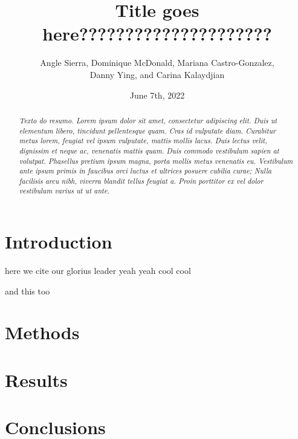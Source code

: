 \documentclass[11pt]{article}
\title {Title goes here?????????????????????\\[1ex]}
\author{
Angle Sierra, 
Dominique McDonald,
Mariana Castro-Gonzalez, \\
Danny Ying,
and Carina Kalaydjian \\[1ex]
}
\date{June 7th, 2022}
\newcommand{\abstractinenglishname}{Abstract}
\newenvironment{abstractinenglish}{
        \def\abstractname{\abstractinenglishname}
	\begin{abstract}
}{
        \end{abstract}
}
\begin{document}
\maketitle
\vspace{6pt}

\begin{abstractinenglish}
\emph{Texto do resumo. Lorem ipsum dolor sit amet, consectetur adipiscing elit. Duis ut elementum libero, tincidunt pellentesque quam. Cras id vulputate diam. Curabitur metus lorem, feugiat vel ipsum vulputate, mattis mollis lacus. Duis lectus velit, dignissim et neque ac, venenatis mattis quam. Duis commodo vestibulum sapien at volutpat. Phasellus pretium ipsum magna, porta mollis metus venenatis eu. Vestibulum ante ipsum primis in faucibus orci luctus et ultrices posuere cubilia curae; Nulla facilisis arcu nibh, viverra blandit tellus feugiat a. Proin porttitor ex vel dolor vestibulum varius ut ut ante.}
\end{abstractinenglish}

\section{Introduction}
here we cite \cite{web1} our glorius leader \cite{web2} yeah yeah cool cool \cite{briney2015data}

and this too \cite{web3}

\section{Methods}

\section{Results}

\section{Conclusions}



\newpage{}



 
\end{document}
